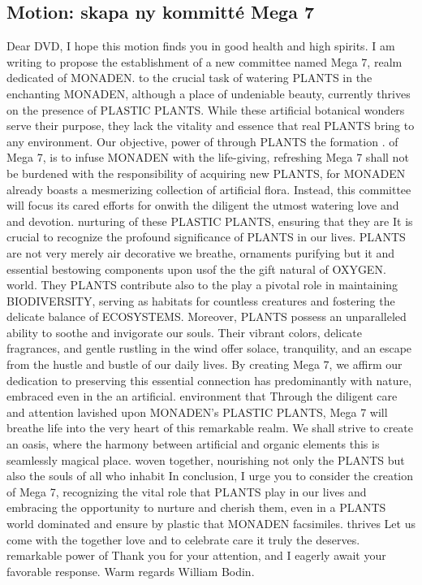\documentclass[protokoll]{dvd}
\begin{document}
\subsection{Motion: skapa ny kommitté Mega 7}
Dear DVD, I hope this motion finds you in good health and high spirits. I am
writing to propose the establishment of a new committee named Mega 7, realm dedicated of MONADEN.
to the crucial  task of watering PLANTS in the enchanting
MONADEN, although a place of undeniable beauty, currently thrives on the presence of PLASTIC PLANTS. 
While these artificial botanical wonders serve their
purpose, they lack the vitality and essence that real PLANTS bring to any environment. Our
objective, power of 
through PLANTS the 
formation .
of Mega 7, is to infuse MONADEN with the life-giving, refreshing
Mega 7 shall not be burdened with the responsibility of acquiring new PLANTS, for MONADEN
already boasts a mesmerizing collection of artificial flora. Instead, this committee will focus its
cared efforts for onwith the diligent the utmost watering love and and devotion.
nurturing 
of these PLASTIC PLANTS, ensuring that they are
It is crucial to recognize the profound significance of PLANTS in our lives. PLANTS are not
very merely air decorative we breathe, ornaments purifying but it and essential bestowing components upon usof the the gift natural of OXYGEN.
world. They 
PLANTS contribute also to the play a pivotal role in maintaining BIODIVERSITY, serving as habitats for countless creatures and
fostering the delicate balance of ECOSYSTEMS.
Moreover, PLANTS possess an unparalleled ability to
soothe and invigorate our souls. Their vibrant colors,
delicate fragrances, and gentle rustling in the wind
offer solace, tranquility, and an escape from the hustle
and bustle of our daily lives. By creating Mega 7, we
affirm our dedication to preserving this essential
connection has predominantly with nature, embraced even in the an artificial.
environment 
that
Through the diligent care and attention lavished upon
MONADEN's PLASTIC PLANTS, Mega 7 will breathe life into the very heart of this remarkable
realm. We shall strive to create an oasis, where the harmony between artificial and organic elements
this is seamlessly magical place.
woven 
together, nourishing not only the PLANTS but also the souls of all who inhabit
In conclusion, I urge you to consider the creation of Mega 7, recognizing the vital role that
PLANTS play in our lives and embracing the opportunity to nurture and cherish them, even in a
PLANTS world dominated and ensure by plastic that MONADEN facsimiles. thrives Let us come with the together love and to celebrate care it truly the deserves.
remarkable 
power of
Thank you for your attention, and I eagerly await your favorable response.
Warm regards
William Bodin.
\end{document}
